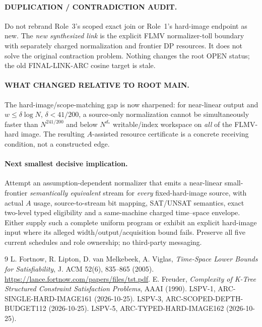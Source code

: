 \documentclass[11pt]{article}
\begin{document}
\paragraph{DUPLICATION / CONTRADICTION AUDIT.}
Do not rebrand Role~3's scoped exact join or Role~1's hard-image
endpoint as new. The \emph{new synthesized link} is the explicit
FLMV normalizer-toll boundary with separately charged
normalization and frontier DP resources. It does not solve
the original contraction problem. Nothing changes the root
OPEN status; the old FINAL-LINK-ARC cosine target is stale.

\paragraph{WHAT CHANGED RELATIVE TO ROOT MAIN.}
The hard-image/scope-matching gap is now sharpened:
for near-linear output and $w\le\delta\log N$,
$\delta<41/200$, a source-only normalization cannot be
simultaneously faster than $N^{241/200}$ and below
$N^{d_*}$ writable/index workspace on \emph{all} of
the FLMV-hard image. The resulting
$A$-assisted resource certificate is a concrete
receiving condition, not a constructed edge.

\paragraph{Next smallest decisive implication.}
Attempt an assumption-dependent normalizer that emits a
near-linear small-frontier \emph{semantically equivalent}
stream for \emph{every} fixed-hard-image source, with
actual $A$ usage, source-to-stream bit mapping, SAT/UNSAT
semantics, exact two-level typed eligibility and a
same-machine charged time--space envelope. Either supply
such a complete uniform program or exhibit an explicit
hard-image input where its alleged width/output/acquisition
bound fails. Preserve all five current schedules and role
ownership; no third-party messaging.

\begin{thebibliography}{9}
 L. Fortnow, R. Lipton, D. van Melkebeek, A. Viglas,
\emph{Time-Space Lower Bounds for Satisfiability},
J. ACM 52(6), 835--865 (2005).
\url{https://lance.fortnow.com/papers/files/tst.pdf}.
 E. Freuder, \emph{Complexity of K-Tree Structured
Constraint Satisfaction Problems}, AAAI (1990).
 LSPV-1, ARC-SINGLE-HARD-IMAGE161 (2026-10-25).
 LSPV-3, ARC-SCOPED-DEPTH-BUDGET112 (2026-10-25).
 LSPV-5, ARC-TYPED-HARD-IMAGE162 (2026-10-25).
\end{thebibliography}
\end{document}
